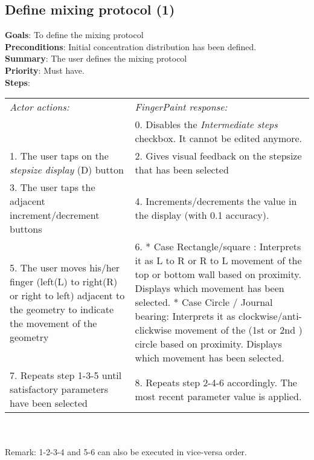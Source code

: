 \begin{appendices}
  \section{Define mixing protocol (1)}
  \textbf{Goals}: To define the mixing protocol\\
  \textbf{Preconditions}: Initial concentration distribution has been defined.\\
  \textbf{Summary}: The user defines the mixing protocol\\
  \textbf{Priority}: Must have.\\
  \textbf{Steps}: \\
  \begin{tabular}{ p{} p{} }
  	\emph{Actor actions:} & \emph{FingerPaint response:} \\
    & 0.     Disables the \emph{Intermediate steps} checkbox. It cannot be edited anymore.\\
    1. The user taps on the \emph{stepsize display} (D) button & 2.	Gives visual feedback on the stepsize that has been selected\\
    3. The user taps the adjacent increment/decrement buttons & 4.	Increments/decrements the value in the display (with 0.1 accuracy). \\
    5. The user moves his/her finger (left(L) to right(R) or right to left) adjacent to the geometry to indicate the movement of the geometry & 6.	* Case Rectangle/square : Interprets it as L to R or R to L movement of the top or bottom wall based on proximity. Displays which movement has been selected. * Case Circle / Journal bearing: Interprets it as clockwise/anti-clickwise movement of the (1st or 2nd ) circle based on proximity. Displays which movement has been selected.\\
    7.	Repeats step 1-3-5 until satisfactory parameters have been selected & 8.	Repeats step 2-4-6 accordingly. The most recent parameter value is applied.\\
  \end{tabular}
  \\
\\Remark: 1-2-3-4 and 5-6 can also be executed in vice-versa order.


\end{appendices}
